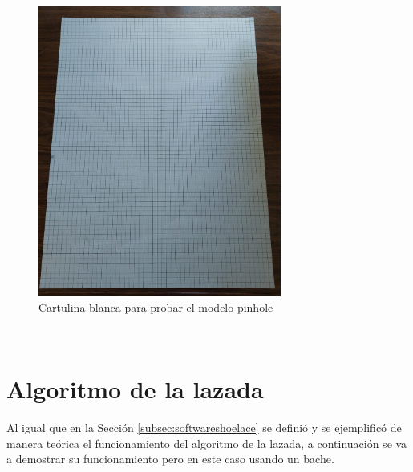 \begin{figure} [h!]
	\begin{center}
			\includegraphics[width=8cm]{figs/cap7/cartulinablanca.jpeg}
		\end{center}
	\caption{Cartulina blanca para probar el modelo pinhole}
	\label{fig:cartulinablanca}
\end{figure}\




\section{Algoritmo de la lazada}
\label{sec:expshoelace}
Al igual que en la Sección \ref{subsec:softwareshoelace} se definió y se ejemplificó de manera teórica el funcionamiento del algoritmo de la lazada, a continuación se va a demostrar su funcionamiento pero en este caso usando un bache. 




